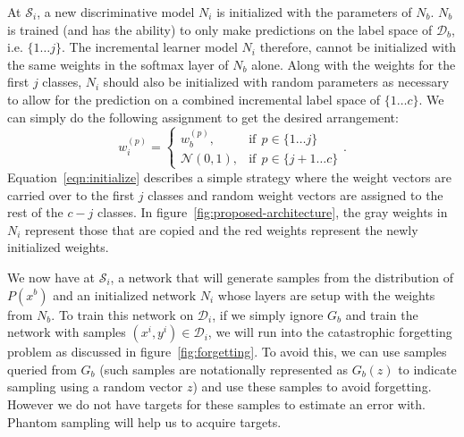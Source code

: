 \documentclass[10pt,twocolumn,letterpaper]{article}
\def \cS{{\mathcal{S}}}
\def \cD{{\mathcal{D}}}
\begin{document}
	At $\cS_i$, a new discriminative model $N_i$ is initialized with the parameters of $N_b$. 
	$N_b$ is trained (and has the ability) to only make predictions on the label space of $\cD_b$, i.e. $\{1 \hdots j\}$. 
	The incremental learner model $N_i$ therefore, cannot be initialized with the same weights in the softmax layer of $N_b$ alone. 
	Along with the weights for the first $j$ classes, $N_i$ should also be initialized with random parameters as necessary to allow for the prediction on a combined incremental label space of $\{1 \hdots c\}$.  
	We can simply do the following assignment to get the desired arrangement:
	\begin{equation}
	\label{eqn:initialize}
	w_i^{(p)} = \begin{cases}
	w_b^{(p)}, 			  & \text{if}  \ \ p \in \{1 \hdots j\} \\
	\mathcal{N}(0,1),  & \text{if} \ \ p \in \{j+1 \hdots c\}
	\end{cases} .
	\end{equation}
	Equation~\ref{eqn:initialize} describes a simple strategy where the weight vectors are carried over to the first $j$ classes and random weight vectors are assigned to the rest of the $c-j$ classes. 
	In figure~\ref{fig:proposed-architecture}, the gray weights in $N_i$ represent those that are copied and the red weights represent the newly initialized weights.
	
	We now have at $\cS_i$, a network that will generate samples from the distribution of $P(x^b)$ and an initialized network $N_i$ whose layers are setup with the weights from $N_b$. 
	To train this network on $\cD_i$, if we simply ignore $G_b$ and train the network with samples $(x^i,y^i) \in \cD_i$, we will run into the catastrophic forgetting problem as discussed in figure~\ref{fig:forgetting}. 
	To avoid this, we can use samples queried from $G_b$ (such samples are notationally represented as $G_b(z)$ to indicate sampling using a random vector $z$) and use these samples to avoid forgetting. 
	However we do not have targets for these samples to estimate an error with. 
	Phantom sampling will help us to acquire targets.
	
\end{document}
